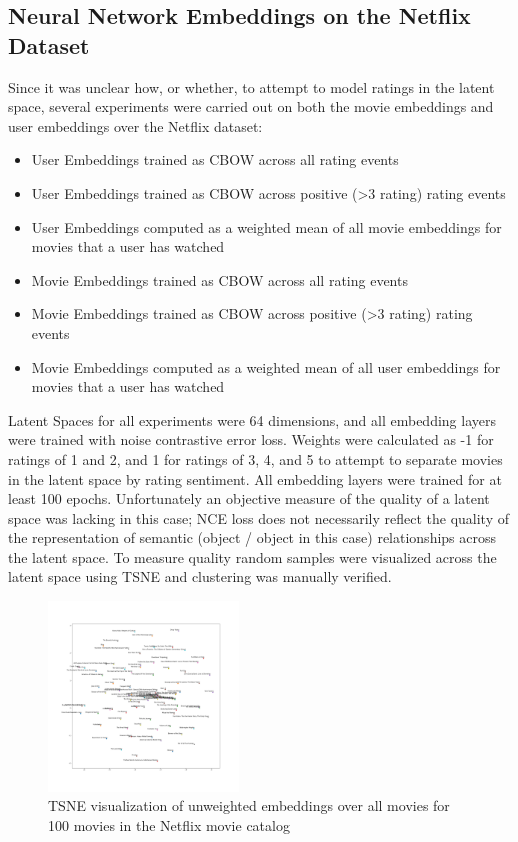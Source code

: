 \subsection{Neural Network Embeddings on the Netflix Dataset}
Since it was unclear how, or whether, to attempt to model ratings in the latent space, several experiments were carried out on both the movie embeddings and user embeddings over the Netflix dataset:
\begin{itemize}
\item User Embeddings trained as CBOW across all rating events
\item User Embeddings trained as CBOW across positive (>3 rating) rating events
\item User Embeddings computed as a weighted mean of all movie embeddings for movies that a user has watched
\item Movie Embeddings trained as CBOW across all rating events
\item Movie Embeddings trained as CBOW across positive (>3 rating) rating events
\item Movie Embeddings computed as a weighted mean of all user embeddings for movies that a user has watched
\end{itemize}
Latent Spaces for all experiments were 64 dimensions, and all embedding layers were trained with noise contrastive error loss. Weights were calculated as -1 for ratings of 1 and 2, and 1 for ratings of 3, 4, and 5 to attempt to separate movies in the latent space by rating sentiment. All embedding layers were trained for at least 100 epochs. Unfortunately an objective measure of the quality of a latent space was lacking in this case; NCE loss does not necessarily reflect the quality of the representation of semantic (object / object in this case) relationships across the latent space. To measure quality random samples were visualized across the latent space using TSNE and clustering was manually verified.
\begin{figure}[h]
    \centering
    \includegraphics[width=0.45\textwidth]{images/nf_movie_emb_100.png}
    \caption{TSNE visualization of unweighted embeddings over all movies for 100 movies in the Netflix movie catalog}
    \label{fig:TSNE Netflix Unweighted Movie Embeddings}
\end{figure}

